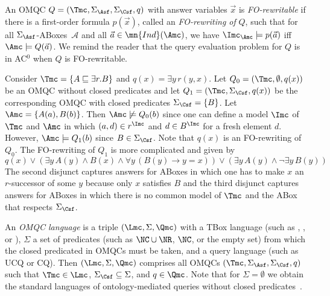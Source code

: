 \documentclass{lmcs}
\theoremstyle{definition}
\begin{document}
An OMQC $Q=(\Tmc,\Sigma_\Asf,\Sigma_\Csf,q)$ with answer variables
$\vec{x}$ is \emph{FO-rewritable} if there is a first-order formula
$p(\vec{x})$, called an \emph{FO-rewriting of} $Q$, such that for all
$\Sigma_{\Asf}$-ABoxes~$\mathcal{A}$ and all
$\vec{a}\in\mn{Ind}(\Amc)$, we have $\Imc_{\Amc} \models p(\vec{a})$
iff $\Amc \models Q(\vec{a})$.  We remind the reader that the query
evaluation problem for $Q$ is in AC$^{0}$ when $Q$ is FO-rewritable.
%
\begin{exa}
Consider $\Tmc=\{A \sqsubseteq \exists r.B\}$ and $q(x)= \exists y\, r(y,x)$. Let
$Q_{0}=(\Tmc,\emptyset,q(x))$ be an OMQC without closed predicates and let $Q_{1}=(\Tmc,\Sigma_{\Csf},q(x))$
be the corresponding OMQC with closed predicates $\Sigma_{\Csf}=\{B\}$. Let $\Amc=\{A(a),B(b)\}$. Then $\Amc\not\models Q_{0}(b)$
since one can define a model $\Imc$ of $\Tmc$ and $\Amc$ in which
$(a,d)\in r^{\Imc}$ and $d\in B^{\Imc}$ for a fresh
element $d$.
However, $\Amc\models Q_{1}(b)$ since $B\in \Sigma_{\Csf}$. Note that $q(x)$ is an FO-rewriting of $Q_{0}$. The
FO-rewriting of $Q_{1}$ is more complicated and given by
$$
q(x) \vee (\exists y\,A(y) \wedge B(x) \wedge \forall y\,(B(y)\rightarrow y=x)) \vee (\exists y\, A(y)\wedge \neg \exists y\, B(y))
$$
The second disjunct captures answers for ABoxes in which one has to make $x$ an $r$-successor of some $y$
because only $x$ satisfies $B$ and the third disjunct captures answers for ABoxes in which there
is no common model of $\Tmc$ and the ABox that respects $\Sigma_{\Csf}$.
\end{exa}
%

An \emph{OMQC language} is a triple
$(\Lmc,\Sigma,\Qmc)$ with \Lmc a TBox language (such as \dlliter,
\EL, or \alchi), $\Sigma$ a set of predicates (such as $\NC \cup \NR$,
$\NC$, or the empty set) from which the closed predicated in OMQCs
must be taken, and \Qmc a query language
(such as UCQ or CQ). Then $(\Lmc,\Sigma,\Qmc)$ comprises all OMQCs
$(\Tmc,\Sigma_\Asf,\Sigma_\Csf,q)$ such that $\Tmc \in \Lmc$,
$\Sigma_\Csf \subseteq \Sigma$, and $q \in \Qmc$.  Note that for
$\Sigma=\emptyset$ we obtain the standard languages of
ontology-mediated queries without closed
predicates~\cite{DBLP:journals/tods/BienvenuCLW14}. 
\end{document}
